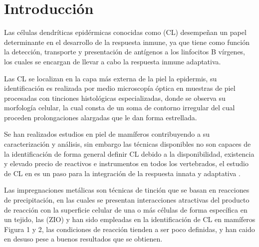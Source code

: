 \section*{Introducción}

Las células dendríticas epidérmicas conocidas como  (CL) desempeñan un papel determinante en el desarrollo de la respuesta inmune, ya que tiene como función la detección, transporte y presentación de antígenos a los linfocitos B vírgenes, los cuales se encargan de llevar a cabo la respuesta inmune adaptativa\cite{article:CL}.

Las CL se localizan en la capa más externa de la piel la epidermis, su identificación es realizada por medio microscopía óptica en muestras de piel procesadas con tinciones histológicas especializadas, donde se observa su morfología celular, la cual consta de un soma de contorno irregular del cual proceden prolongaciones alargadas que le dan forma estrellada.

Se han realizados estudios en piel de mamíferos contribuyendo a su caracterización y análisis, sin embargo las técnicas disponibles no son capaces de la identificación de forma general definir CL debido a la disponibilidad, existencia y elevado precio de reactivos e instrumentos en todos los vertebrados, el estudio de CL en  es un paso para la integración de la respuesta innata y adaptativa \cite{article:vertebrados}.

Las impregnaciones metálicas son técnicas de tinción que se basan en reacciones de precipitación, en las cuales se presentan interacciones atractivas del producto de reacción con la superficie celular de una o más células de forma específica en un tejido, las  (ZIO) \cite{article:ZIO} y  \cite{article:ClAu} han sido empleadas en la identificación de CL en mamíferos Figura 1 y 2, las condiciones de reacción tienden a ser poco definidas, y han caido en desuso pese a buenos resultados que se obtienen.

